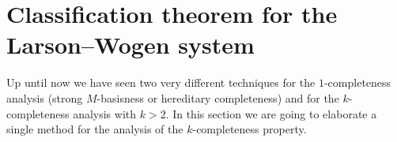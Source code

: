 \section{Classification theorem for the Larson--Wogen system}
  Up until now we have seen two very different techniques for the $1$-completeness analysis (strong $M$-basisness or hereditary completeness) and
    for the $k$-completeness analysis with $k>2$.
  In this section we are going to elaborate a single method for the analysis of the $k$-completeness property.

